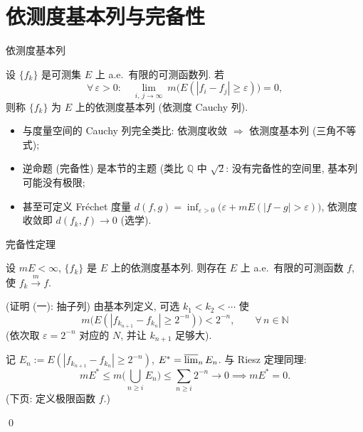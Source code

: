 
\section[完备性]{依测度基本列与完备性}


\begin{frame}{依测度基本列}

\begin{Def}[依测度基本列]
设 $\{f_k\}$ 是可测集 $E$ 上 a.e.\ 有限的可测函数列. 若
\[
\forall\, \varepsilon > 0:\quad
\lim_{i,\, j \to \infty}\ m\big(E(|f_i - f_j| \geqslant \varepsilon)\big) = 0,
\]
则称 $\{f_k\}$ 为 $E$ 上的\alert{依测度基本列} (依测度 Cauchy 列).
\end{Def}

\pause

\begin{itemize}
\item 与度量空间的 Cauchy 列完全类比: 依测度收敛 $\Longrightarrow$ 依测度基本列 (三角不等式);
\item \alert{逆命题} (完备性) 是本节的主题 (类比 $\mathbb{Q}$ 中 $\sqrt2$: 没有完备性的空间里, 基本列可能没有极限;
\item 甚至可定义 Fr\'echet 度量 $d(f, g) = \displaystyle\inf_{\varepsilon > 0} \big(\varepsilon + mE(|f - g| > \varepsilon)\big)$, 依测度收敛即 $d(f_k, f) \to 0$ (选学).
\end{itemize}

\end{frame}


\begin{frame}{完备性定理}

\begin{thm}[完备性]
设 $mE < \infty$, $\{f_k\}$ 是 $E$ 上的依测度基本列. 则存在 $E$ 上 a.e.\ 有限的可测函数 $f$, 使 $f_k \xrightarrow{m} f$.
\end{thm}

\pause

\startproof[bg=yellow, fg=red](证明 (一): 抽子列)
由基本列定义, 可选 $k_1 < k_2 < \cdots$ 使
\[
m\big(E(|f_{k_{n+1}} - f_{k_n}| \geqslant 2^{-n})\big) < 2^{-n},
\qquad \forall\, n \in \mathbb{N}
\]
(依次取 $\varepsilon = 2^{-n}$ 对应的 $N$, 并让 $k_{n+1}$ 足够大).

\pause

记 $E_n := E(|f_{k_{n+1}} - f_{k_n}| \geqslant 2^{-n})$, $E^* = \varlimsup_{n} E_n$. 与 Riesz 定理同理:
\[
mE^* \leqslant m\Big(\bigcup_{n \geqslant i} E_n\Big)
\leqslant \sum_{n \geqslant i} 2^{-n} \longrightarrow 0
\implies mE^* = 0 .
\]
(下页: 定义极限函数 $f$.)

\qed

\end{frame}

